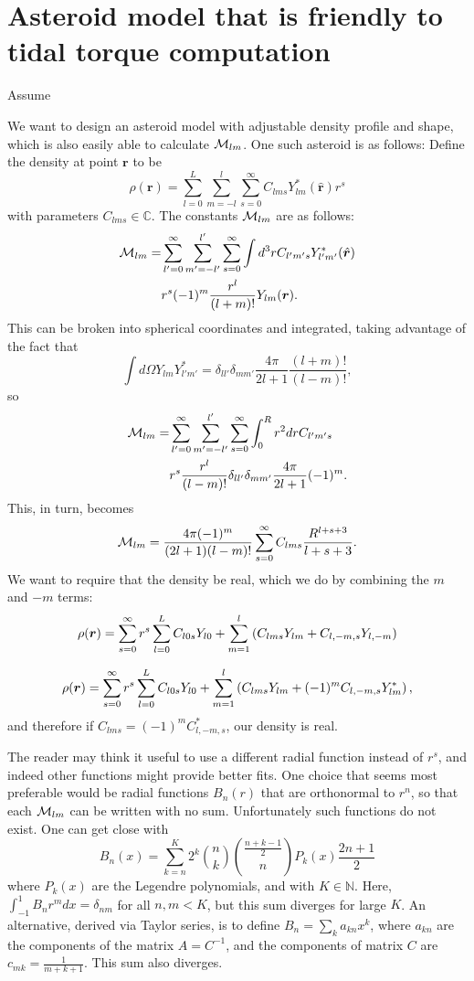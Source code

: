 \documentclass[aps,twocolumn,secnumarabic,balancelastpage,amsmath,amssymb,nofootinbib,floatfix]{revtex4-1}
\begin{document}
\section{Asteroid model that is friendly to tidal torque computation}
Assume

We want to design an asteroid model with adjustable density profile and shape, which is also easily able to calculate $\mathcal{M}_{lm}$. One such asteroid is as follows:
Define the density at point $\bm r$ to be
$$\rho(\bm r) = \sum_{l=0}^L \sum_{m=-l}^l \sum_{s=0}^\infty C_{lms}Y^*_{lm}(\hat{\bm r})r^s$$
with parameters $C_{lms} \in \mathbb{C}$. The constants $\mathcal{M}_{lm}$ are as follows:
\begin{equation*}
\begin{aligned}\mathcal{M}_{lm} = &\sum_{l'=0}^\infty \sum_{m'=-l'}^{l'} \sum_{s=0}^\infty\int d^3 r  C_{l'm's}Y^*_{l'm'}(\hat{\bm r})\\
&r^s (-1)^m \frac{r^l}{(l+m)!}Y_{lm}(\bm r).
\end{aligned}
\end{equation*}
This can be broken into spherical coordinates and integrated, taking advantage of the fact that
$$\int d\Omega Y_{lm}Y^*_{l'm'}=\delta_{ll'}\delta_{mm'}\frac{4\pi}{2l+1}\frac{(l+m)!}{(l-m)!},$$
so
\begin{equation*}
\begin{aligned}\mathcal{M}_{lm} = &\sum_{l'=0}^\infty \sum_{m'=-l'}^{l'} \sum_{s=0}^\infty\int_0^R r^2 dr  C_{l'm's}\\
&r^s \frac{r^l}{(l-m)!}\delta_{ll'}\delta_{mm'}\frac{4\pi}{2l+1}(-1)^m.
\end{aligned}
\end{equation*}
This, in turn, becomes
$$\mathcal{M}_{lm} = \frac{4\pi (-1)^m}{(2l+1)(l-m)!}\sum_{s=0}^\infty C_{lms} \frac{R^{l+s+3}}{l+s+3}.$$
We want to require that the density be real, which we do by combining the $m$ and $-m$ terms:
$$\rho(\bm r) =  \sum_{s=0}^\infty r^s\sum_{l=0}^L C_{l0s}Y_{l0} + \sum_{m=1}^l \left( C_{lms}Y_{lm} + C_{l,-m,s}Y_{l,-m} \right)$$

$$\rho(\bm r) =  \sum_{s=0}^\infty r^s\sum_{l=0}^L C_{l0s}Y_{l0} + \sum_{m=1}^l \left( C_{lms}Y_{lm} + (-1)^m C_{l,-m,s}Y^*_{lm} \right),$$
and therefore if $C_{lms} = (-1)^m C_{l,-m,s}^*$, our density is real.

The reader may think it useful to use a different radial function instead of $r^s$, and indeed other functions might provide better fits. One choice that seems most preferable would be radial functions $B_{n}(r)$ that are orthonormal to $r^n$, so that each $\mathcal{M}_{lm}$ can be written with no sum. Unfortunately such functions do not exist. One can get close with
$$B_n(x)=\sum_{k=n}^K 2^k \binom{n}{k} \binom{\frac{n+k-1}{2}}{n}P_k(x)\frac{2n + 1}{2}$$
where $P_k(x)$ are the Legendre polynomials, and with $K \in \mathbb{N}$. Here, $\int_{-1}^1 B_n r^m dx = \delta_{nm}$ for all $n, m < K$, but this sum diverges for large $K$. An alternative, derived via Taylor series, is to define $B_n = \sum_k a_{kn}x^k$, where $a_{kn}$ are the components of the matrix $A=C^{-1}$, and the components of matrix $C$ are $c_{mk}=\frac{1}{m+k+1}$. This sum also diverges.
\end{document}
